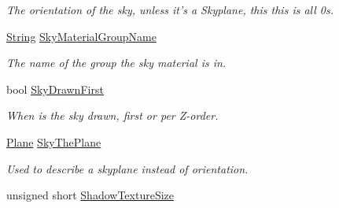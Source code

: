 \begin{DoxyCompactItemize}
\begin{DoxyCompactList}\small\item\em The orientation of the sky, unless it's a Skyplane, this this is all 0s. \item\end{DoxyCompactList}\item 
\hypertarget{classphys_1_1internal_1_1SceneManagerData_a6449ba7dd0d50aa7c121e82982aef54c}{
\hyperlink{namespacephys_aa03900411993de7fbfec4789bc1d392e}{String} \hyperlink{classphys_1_1internal_1_1SceneManagerData_a6449ba7dd0d50aa7c121e82982aef54c}{SkyMaterialGroupName}}
\label{d7/dbb/classphys_1_1internal_1_1SceneManagerData_a6449ba7dd0d50aa7c121e82982aef54c}

\begin{DoxyCompactList}\small\item\em The name of the group the sky material is in. \item\end{DoxyCompactList}\item 
\hypertarget{classphys_1_1internal_1_1SceneManagerData_a26e836bd8dd96a85ff9a9dac53a4a16d}{
bool \hyperlink{classphys_1_1internal_1_1SceneManagerData_a26e836bd8dd96a85ff9a9dac53a4a16d}{SkyDrawnFirst}}
\label{d7/dbb/classphys_1_1internal_1_1SceneManagerData_a26e836bd8dd96a85ff9a9dac53a4a16d}

\begin{DoxyCompactList}\small\item\em When is the sky drawn, first or per Z-\/order. \item\end{DoxyCompactList}\item 
\hypertarget{classphys_1_1internal_1_1SceneManagerData_aed226bb4935954873f0d4c7bf8308a43}{
\hyperlink{classphys_1_1Plane}{Plane} \hyperlink{classphys_1_1internal_1_1SceneManagerData_aed226bb4935954873f0d4c7bf8308a43}{SkyThePlane}}
\label{d7/dbb/classphys_1_1internal_1_1SceneManagerData_aed226bb4935954873f0d4c7bf8308a43}

\begin{DoxyCompactList}\small\item\em Used to describe a skyplane instead of orientation. \item\end{DoxyCompactList}\item 
\hypertarget{classphys_1_1internal_1_1SceneManagerData_a6564afc7255e32e9211568aab4a561f2}{
unsigned short \hyperlink{classphys_1_1internal_1_1SceneManagerData_a6564afc7255e32e9211568aab4a561f2}{ShadowTextureSize}}
\label{d7/dbb/classphys_1_1internal_1_1SceneManagerData_a6564afc7255e32e9211568aab4a561f2}


\end{DoxyCompactItemize}
